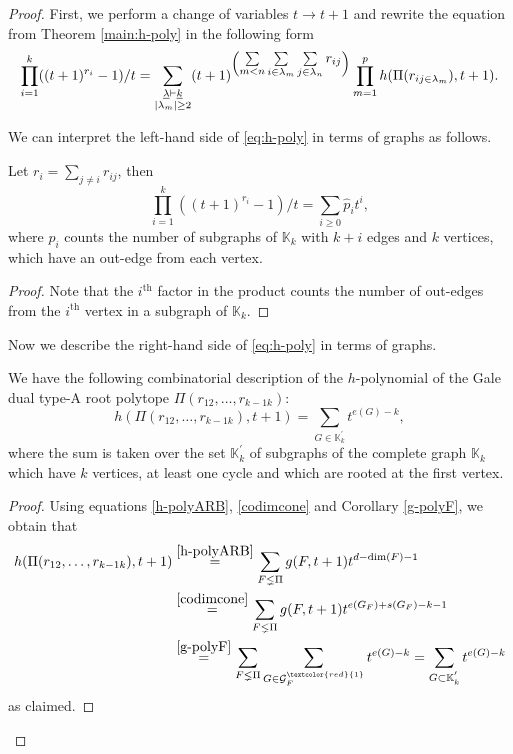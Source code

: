 \begin{proof}
First, we perform a change of variables $t\to t+1$ and rewrite the equation from Theorem \ref{main:h-poly} in the following form
\begin{equation}\label{eq:h-poly}
\prod_{i=1}^k ((t+1)^{r_i}-1)/t =  \sum_{\substack{\underline{\lambda}\vdash\underline{k} \\  |\lambda_m|\geq 2}}(t+1)^{\Big(\vcenter{\hbox{$\sum\limits_{m<n}\sum\limits_{i\in \lambda_m}\sum\limits_{j\in \lambda_n}r_{ij}$}}\Big)}\prod_{m=1}^ph(\Pi({r}_{ij\in\lambda_m}),t+1).
\end{equation}


We can interpret the left-hand side of \eqref{eq:h-poly} in terms of graphs as follows.
\begin{lemma}\label{LHS12}
 Let $r_i=\sum_{j\neq i}r_{ij}$, then
$$\prod_{i=1}^k ((t+1)^{r_i}-1)/t = \sum_{i\geq 0} \hat{p}_it^i,$$
where $\hat{p}_i$ counts the number of subgraphs of $\mathbb{K}_k$ with $k+i$ edges and $k$ vertices, which have an out-edge from each vertex.
\end{lemma}
\begin{proof}
Note that the $i^{\mathrm{th}}$ factor in the product counts the number of out-edges from the $i^{\mathrm{th}}$ vertex in a subgraph of $\mathbb{K}_k$. 
\end{proof}

Now we describe the right-hand side of \eqref{eq:h-poly} in terms of graphs. 
\begin{theorem}\label{hgraphs}
We have the following combinatorial description of the $ h $-polynomial of the Gale dual type-A root polytope $\Pi(r_{12}, \ldots ,r_{k-1 k})$:
\begin{equation}
h(\Pi(r_{12}, \ldots ,r_{k-1 k}),t+1) =\sum_{G\in \mathbb{K}^{'}_k}t^{e(G)-k},
\end{equation}
where the sum is taken over the set $ \mathbb{K}^{'}_k $ of subgraphs of the complete graph $\mathbb{K}_k$ which have $k$ vertices, at least one cycle and which are rooted at the first vertex. 
\end{theorem}
\begin{proof}
Using equations \eqref{h-polyARB}, \eqref{codimcone} and Corollary \ref{g-polyF}, we obtain that
\begin{align}\label{h-polyint}
h(\Pi(r_{12}, \ldots ,r_{k-1 k}),t+1)  
&\overset{{\eqref{h-polyARB}}}= \sum_{F\lneq\Pi}g(F, t+1) t^{d-\mathrm{dim}(F)-1}  \\
&\overset{{\eqref{codimcone}}}= \sum_{F\lneq\Pi}g(F, t+1) t^{e(G_F)+s(G_F)-k-1}  \\ \label{test}
&\overset{\ref{g-polyF}}= \sum_{F\lneq\Pi} \sum_{G\in \mathcal{G}^{\textcolor{red}{1}}_F} t^{e(G)-k} = \sum_{G\subset \mathbb{K}^{'}_k}t^{e(G)-k}
\end{align}
as claimed.
\end{proof}


\end{proof}
